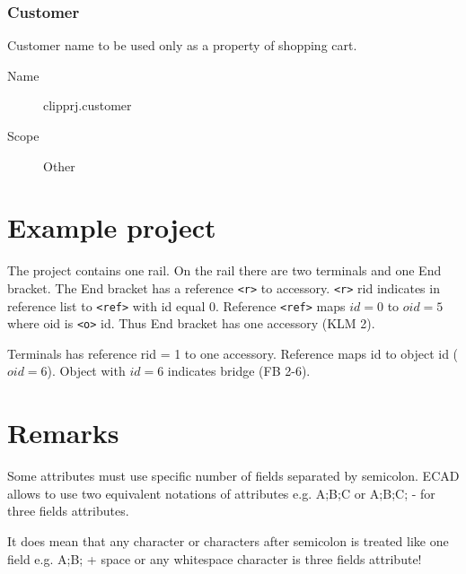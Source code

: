 \documentclass[%
	a4paper,
	oneside,
	listof=numbered,
	parskip=half,
	headsepline=true,
	footsepline=true,
	]{scrbook}
\begin{document}
\subsection{Customer}

Customer name to be used only as a property of shopping cart.

\begin{description}
	\item[Name] clipprj.customer
	\item[Scope] Other
\end{description}

\chapter{Example project}



The project contains one rail. On the rail there are two terminals and one End bracket. The End bracket has a reference \verb|<r>| to accessory. \verb|<r>| rid indicates in reference list to \verb|<ref>| with id equal $0$. Reference \verb|<ref>| maps $id=0$ to $oid=5$ where oid is \verb|<o>| id. Thus End bracket has one accessory (KLM 2).

Terminals has reference rid = 1 to one accessory. Reference maps id to object id ($oid=6$). Object with $id=6$ indicates bridge (FB 2-6). 

\chapter{Remarks}

Some attributes must use specific number of fields separated by semicolon. 
ECAD allows to use two equivalent notations of attributes e.g. A;B;C or A;B;C; - for three fields attributes.

It does mean that any character or characters after semicolon is treated like one field e.g. A;B; + \glqq{}space or any whitespace character\grqq{} is three fields attribute!  

\listoffigures
\listoftables
\lstlistoflistings



\end{document}

